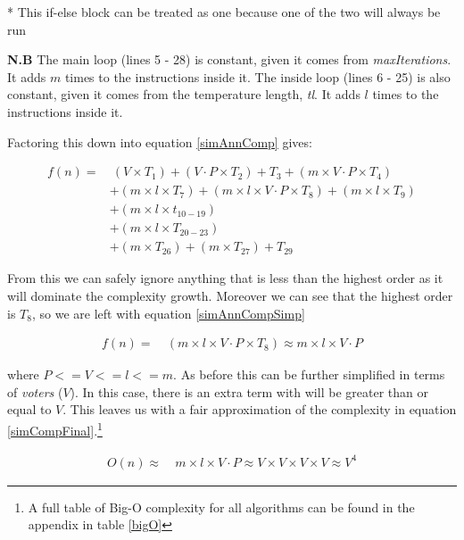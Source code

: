 \documentclass[12pt]{report}
\begin{document}
* This if-else block can be treated as one because one of the two will always be run

\textbf{N.B} The main loop (lines 5 - 28) is constant, given it comes from \textit{maxIterations}. It adds $m$ times to the instructions inside it. The inside loop (lines 6 - 25) is also constant, given it comes from the temperature length, \textit{tl}. It adds $l$ times to the instructions inside it.

Factoring this down into equation \ref{simAnnComp} gives: 

\begin{equation}\label{simAnnComp}
\begin{aligned}
	f(n) ={} & \ (V \times T_1) + (V \cdot P \times T_2) + T_3  + (m \times V \cdot P \times T_4) \\
	 	& + (m \times l \times T_7) + (m \times l \times V \cdot P  \times T_8) + (m \times l \times T_9) \\
		& + (m \times l \times t_{10 - 19}) \\
		& + (m \times l \times T_{20 - 23}) \\
		& + (m \times T_{26}) + (m \times T_{27}) + T_{29}
\end{aligned}
\end{equation}

From this we can safely ignore anything that is less than the highest order as it will dominate the complexity growth. Moreover we can see that the highest order is $T_8$, so we are left with equation \ref{simAnnCompSimp}

\begin{equation}\label{simAnnCompSimp}
\begin{aligned}
	f(n) ={} & \ (m \times l \times V \cdot P \times T_8) \approx m \times l \times V \cdot P
\end{aligned}
\end{equation}

where $P <= V <= l <= m$. As before this can be further simplified in terms of \textit{voters} ($V$). In this case, there is an extra term with will be greater than or equal to $V$. This leaves us with a fair approximation of the complexity in equation \ref{simCompFinal}.\footnote{A full table of Big-O complexity for all algorithms can be found in the appendix in table \ref{bigO}}

\begin{equation}\label{simCompFinal}
\begin{aligned}
	O(n) \approx{} & \ m \times l \times V \cdot P \approx V \times V \times V \times V \approx V^4
\end{aligned}
\end{equation}
\end{document}
